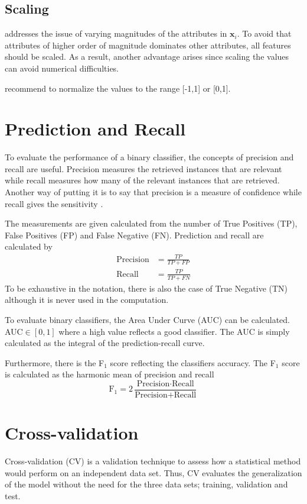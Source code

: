 \subsection{Scaling \label{scale}}
\citet{Hsu10apractical} addresses the issue of varying magnitudes of the attributes in $\bm{x}_i$. To avoid that attributes of higher order of magnitude dominates other attributes, all features should be scaled. As a result, another advantage arises since scaling the values can avoid numerical difficulties. \author{Hsu10apractical} recommend to normalize the values to the range [-1,1] or [0,1].

\section{Prediction and Recall}
To evaluate the performance of a binary classifier, the concepts of precision and recall are useful. Precision measures the retrieved instances that are relevant while recall measures how many of the relevant instances that are retrieved. Another way of putting it is to say that precision is a measure of confidence while recall gives the sensitivity \citep{powers2011}.

The measurements are given calculated from the number of True Positives (TP), False Positives (FP) and False Negative (FN). Prediction and recall are calculated by \citep{powers2011}
\begin{align}
\text{Precision}&=\frac{TP}{TP+FP}\\
\text{Recall}&=\frac{TP}{TP+FN}
\end{align}
To be exhaustive in the notation, there is also the case of True Negative (TN) although it is never used in the computation.

To evaluate binary classifiers, the Area Under Curve (AUC) can be calculated. AUC$\in[0,1]$ where a high value reflects a good classifier. The AUC is simply calculated as the integral of the prediction-recall curve.

Furthermore, there is the F$_1$ score reflecting the classifiers accuracy. The F$_1$ score is calculated as the harmonic mean of precision and recall \citep{powers2011}
\begin{equation}
    \text{F}_1 = 2\frac{\text{Precision}\cdot \text{Recall}}{\text{Precision}+\text{Recall}}
\end{equation}

\section{Cross-validation}
Cross-validation (CV) is a validation technique to assess how a statistical method would perform on an independent data set. Thus, CV evaluates the generalization of the model without the need for the three data sets; training, validation and test.


